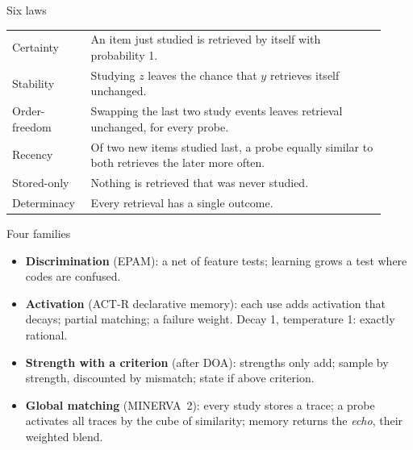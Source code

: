 \documentclass[aspectratio=169,11pt]{beamer}
\begin{document}
\begin{frame}{Six laws}
  \small
  \begin{tabular}{p{0.18\linewidth}p{0.74\linewidth}}
    \toprule
    Certainty & An item just studied is retrieved by itself with probability 1.\\
    Stability & Studying $z$ leaves the chance that $y$ retrieves itself unchanged.\\
    Order-freedom & Swapping the last two study events leaves retrieval unchanged, for every probe.\\
    Recency & Of two new items studied last, a probe equally similar to both retrieves the later more often.\\
    Stored-only & Nothing is retrieved that was never studied.\\
    Determinacy & Every retrieval has a single outcome.\\
    \bottomrule
  \end{tabular}
\end{frame}

\begin{frame}{Four families}
  \begin{itemize}
    \item \textbf{Discrimination} (EPAM): a net of feature tests; learning grows a test where codes are confused.
    \item \textbf{Activation} (ACT-R declarative memory): each use adds activation that decays; partial matching; a failure weight. Decay 1, temperature 1: exactly rational.
    \item \textbf{Strength with a criterion} (after DOA): strengths only add; sample by strength, discounted by mismatch; state if above criterion.
    \item \textbf{Global matching} (MINERVA~2): every study stores a trace; a probe activates all traces by the cube of similarity; memory returns the \emph{echo}, their weighted blend.
  \end{itemize}
\end{frame}
\end{document}
